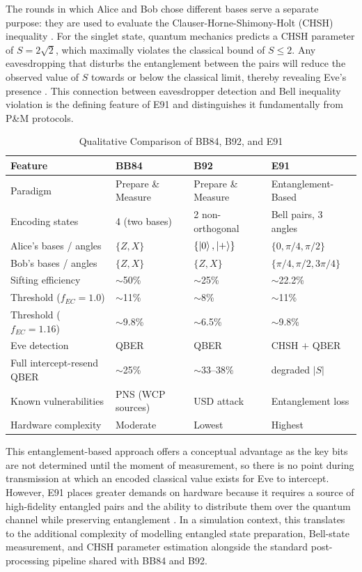 \documentclass[10pt, a4paper]{report}
\renewcommand{\footnotesize}{\fontsize{8}{9}\selectfont}
\begin{document}
The rounds in which Alice and Bob chose different bases serve a separate purpose: they are used to evaluate the Clauser-Horne-Shimony-Holt (CHSH) inequality \cite{QKDbible}. For the singlet state, quantum mechanics predicts a CHSH parameter of $S = 2\sqrt{2}$, which maximally violates the classical bound of $S \leq 2$. Any eavesdropping that disturbs the entanglement between the pairs will reduce the observed value of $S$ towards or below the classical limit, thereby revealing Eve's presence \cite{ekertQI, E91}. This connection between eavesdropper detection and Bell inequality violation is the defining feature of E91 and distinguishes it fundamentally from P\&M protocols.

\begin{table}[h]
\centering
\caption{Qualitative Comparison of BB84, B92, and E91}
\label{tab:protocol-comparison}
\footnotesize
\begin{tabularx}{\linewidth}{@{}l X X X@{}}
\toprule
\textbf{Feature} & \textbf{BB84} & \textbf{B92} & \textbf{E91} \\
\midrule
Paradigm & Prepare \& Measure & Prepare \& Measure & Entanglement-Based \\
Encoding states & 4 (two bases) & 2 non-orthogonal & Bell pairs, 3 angles \\
Alice's bases / angles & $\{Z, X\}$ & $\{\ket{0}, \ket{+}\}$ & $\{0, \pi/4, \pi/2\}$ \\
Bob's bases / angles & $\{Z, X\}$ & $\{Z, X\}$ & $\{\pi/4, \pi/2, 3\pi/4\}$ \\
Sifting efficiency & $\sim$50\% & $\sim$25\% & $\sim$22.2\% \\
Threshold ($f_{EC}\!=\!1.0$) & $\sim$11\% & $\sim$8\% & $\sim$11\% \\
Threshold ($f_{EC}\!=\!1.16$) & $\sim$9.8\% & $\sim$6.5\% & $\sim$9.8\% \\
Eve detection & QBER & QBER & CHSH $+$ QBER \\
Full intercept-resend QBER & $\sim$25\% & $\sim$33--38\% & degraded $|S|$ \\
Known vulnerabilities & PNS (WCP sources) & USD attack & Entanglement loss \\
Hardware complexity & Moderate & Lowest & Highest \\
\bottomrule
\end{tabularx}
\end{table}

This entanglement-based approach offers a conceptual advantage as the key bits are not determined until the moment of measurement, so there is no point during transmission at which an encoded classical value exists for Eve to intercept. However, E91 places greater demands on hardware because it requires a source of high-fidelity entangled pairs and the ability to distribute them over the quantum channel while preserving entanglement \cite{ekertQI}. In a simulation context, this translates to the additional complexity of modelling entangled state preparation, Bell-state measurement, and CHSH parameter estimation alongside the standard post-processing pipeline shared with BB84 and B92.
\end{document}
